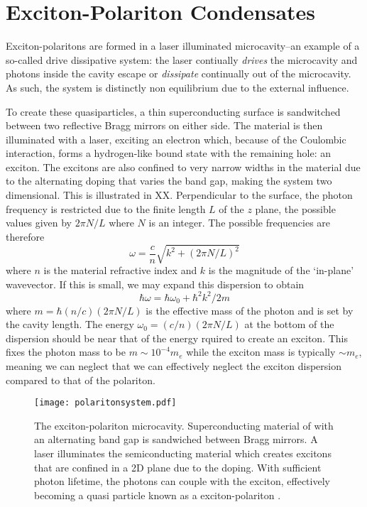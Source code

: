 \section{Exciton-Polariton Condensates}

Exciton-polaritons are formed in a laser illuminated microcavity--an example of a so-called drive dissipative system: the laser contiually \emph{drives} the microcavity and photons inside the cavity escape or 
\emph{dissipate} continually out of the microcavity. As such, the system is distinctly non equilibrium due to the external influence. 

To create these quasiparticles, a thin superconducting surface is sandwitched between two reflective Bragg mirrors on either side. The material is then illuminated with a laser, exciting an electron which, because of the Coulombic interaction, forms a hydrogen-like bound state with the remaining hole: an exciton. The excitons are also confined to very narrow widths in the material due to the alternating doping that varies the band gap, making the system two dimensional. This is illustrated in XX. Perpendicular to the surface, the photon frequency is restricted due to the finite length $L$ of the $z$ plane, the possible values given by $2\pi N/L$ where $N$ is an integer. The possible frequencies are therefore 
\[
\omega = \frac{c}{n}\sqrt{k^2 + (2\pi N/L)^2} 
\]
where $n$ is the material refractive index and $k$ is the magnitude of the `in-plane' wavevector. If this is small, we may expand this dispersion to obtain
\[
\hbar \omega = \hbar \omega_0 + \hbar^2k^2/2m 
\]
where $m = \hbar(n/c)(2 \pi N /L)$ is the effective mass of the photon and is set by the cavity length. The energy  $\omega_0 = (c/n)(2 \pi N / L)$ at the bottom of the dispersion should be near that of the energy rquired to create an exciton. This fixes the photon mass to be $m \sim 10^{-4}m_e$ while the exciton mass is typically $\sim m_e$, meaning we can neglect that we can effectively neglect the exciton dispersion compared to that of the polariton. 

\begin{figure}[htbp!]
	\centering
	\texttt{[image: polaritonsystem.pdf]}
	\caption{The exciton-polariton microcavity.
	Superconducting material of with an alternating band gap is sandwiched between Bragg mirrors. 
	A laser illuminates the semiconducting material which creates excitons that are confined in a 2D plane due to the doping. 
	With sufficient photon lifetime, the photons can couple with the exciton, effectively becoming a quasi particle known as a exciton-polariton \cite{Byrnes2014}.}
	\label{fig:exciton-polariton}
\end{figure}

